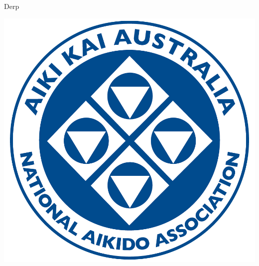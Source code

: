 \documentclass[10pt]{article}
\begin{document}
%
\begin{minipage}{5cm}
{\Huge Derp}
\end{minipage}
%
\begin{minipage}{5cm}
\centering\includegraphics[width=0.7\linewidth]{figure/logo-aka.jpg}
\end{minipage}
%
\end{document}
